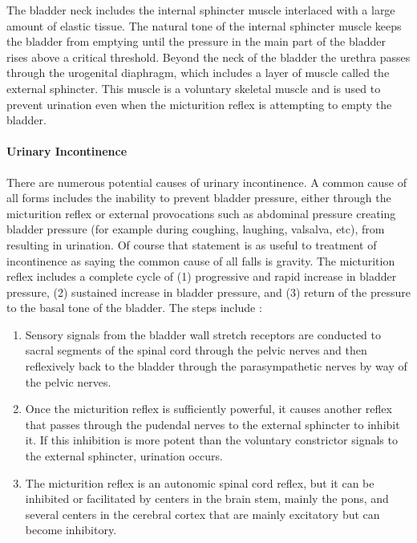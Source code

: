 The bladder neck includes the internal sphincter muscle interlaced with a large amount of elastic tissue. The natural tone of the internal sphincter muscle keeps the bladder from emptying until the pressure in the main part of the bladder rises above a critical threshold. Beyond the neck of the bladder the urethra passes through the urogenital diaphragm, which includes a layer of muscle called the external sphincter. This muscle is a voluntary skeletal muscle and is used to prevent urination even when the micturition reflex is attempting to empty the bladder.

\paragraph{Urinary Incontinence}

There are numerous potential causes of urinary incontinence. A common cause of all forms includes the inability to prevent bladder pressure, either through the micturition reflex or external provocations such as abdominal pressure creating bladder pressure (for example during coughing, laughing, valsalva, etc), from resulting in urination. Of course that statement is as useful to treatment of incontinence as saying the common cause of all falls is gravity. The micturition reflex includes a complete cycle of (1) progressive and rapid increase in bladder pressure, (2) sustained increase in bladder pressure, and (3) return of the pressure to the basal tone of the bladder. 
\vspace{4mm}
The steps include \cite{hall_guyton_2020}:

\begin{enumerate}
    \item Sensory signals from the bladder wall stretch receptors are conducted to sacral segments of the spinal cord through the pelvic nerves and then reflexively back to the bladder through the parasympathetic nerves by way of the pelvic nerves.
    \item  Once the micturition reflex is sufficiently powerful, it causes another reflex that passes through the pudendal nerves to the external sphincter to inhibit it. If this inhibition is more potent than the voluntary constrictor signals to the external sphincter, urination occurs.
    \item  The micturition reflex is an autonomic spinal cord reflex, but it can be inhibited or facilitated by centers in the brain stem, mainly the pons, and several centers in the cerebral cortex that are mainly excitatory but can become inhibitory.
\end{enumerate}

